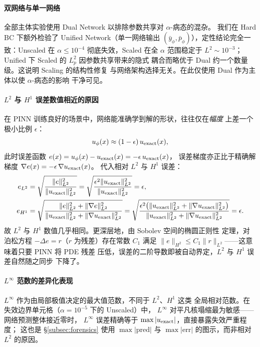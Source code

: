 \documentclass{xmu}
\theoremstyle{plain}
\theoremstyle{remark}
\begin{document}
\paragraph{双网络与单一网络}
全部主体实验使用 Dual Network 以排除参数共享对 $\alpha$-病态的混杂。
我们在 Hard BC 下额外检验了 Unified Network（单一网络输出
$(\bar y_\phi, \bar p_\phi)$），定性结论完全一致：Unscaled 在
$\alpha\le 10^{-4}$ 彻底失效，Scaled 在全 $\alpha$ 范围稳定于
$L^2\sim 10^{-3}$；Unified 下 Scaled 的 $L^2_p$ 因参数共享带来的隐式
耦合而略优于 Dual 约一个数量级。这说明 Scaling 的结构性修复
与网络架构选择无关。在此仅使用 Dual 作为主体以使 $\alpha$-病态的影响
干净可见。

\paragraph{$L^2$ 与 $H^1$ 误差数值相近的原因\cite{32}}
在 PINN 训练良好的场景中，网络能准确学到解的形状，往往仅在\emph{幅度}
上差一个极小比例 $\epsilon$：
\[
  u_\phi(x) \approx (1 - \epsilon)\,u_{\rm exact}(x),
\]
此时误差函数 $e(x) = u_\phi(x) - u_{\rm exact}(x) = -\epsilon\,u_{\rm exact}(x)$，
误差梯度亦正比于精确解梯度 $\nabla e(x) = -\epsilon\,\nabla u_{\rm exact}(x)$。
代入相对 $L^2$ 与 $H^1$ 误差：
\begin{align*}
  e_{L^2}
   &= \sqrt{\frac{\|e\|_{L^2}^2}{\|u_{\rm exact}\|_{L^2}^2}}
    = \sqrt{\frac{\epsilon^2\|u_{\rm exact}\|_{L^2}^2}{\|u_{\rm exact}\|_{L^2}^2}}
    = \epsilon,\\
  e_{H^1}
   &= \sqrt{\frac{\|e\|_{L^2}^2 + \|\nabla e\|_{L^2}^2}
                 {\|u_{\rm exact}\|_{L^2}^2 + \|\nabla u_{\rm exact}\|_{L^2}^2}}
    = \sqrt{\frac{\epsilon^2\bigl(\|u_{\rm exact}\|_{L^2}^2 + \|\nabla u_{\rm exact}\|_{L^2}^2\bigr)}
                 {\|u_{\rm exact}\|_{L^2}^2 + \|\nabla u_{\rm exact}\|_{L^2}^2}}
    = \epsilon.
\end{align*}
故 $L^2$ 与 $H^1$ 数值几乎相同。更深层地，由 Sobolev 空间的椭圆正则性
定理，对泊松方程 $-\Delta e = r$（$r$ 为残差）存在常数 $C_1$ 满足
$\|e\|_{H^2}\le C_1\|r\|_{L^2}$——这意味着只要 PINN 将 PDE 残差
压低，误差的二阶导数即被自动界定，$L^2$ 与 $H^1$ 误差自然随之同步
下降了。

\paragraph{$L^\infty$ 范数的差异化表现}
$L^\infty$ 作为由局部极值决定的最大值范数，不同于 $L^2$、$H^1$ 这类
全局相对范数。在失效边界单元格（$\alpha = 10^{-5}$ 下的 Unscaled）中，
$L^\infty$ 对平凡核塌缩最为敏感——网络预测整体接近零时，
$L^\infty$ 误差精确等于 $\max|u_{\rm exact}|$，直接暴露失效严重程度；
这也是 §\ref{subsec:forensics} 使用 $\max|\mathrm{pred}|$
与 $\max|\mathrm{err}|$ 的图示，而非相对 $L^2$ 的原因。
\end{document}
